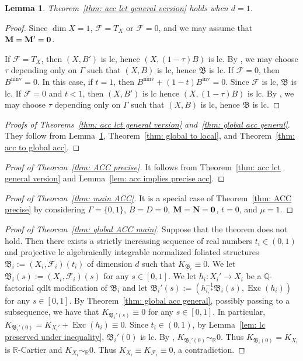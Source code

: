 \documentclass[11pt,reqno]{amsart}
\numberwithin{equation}{section}
\newcommand{\Mm}{{\bf{M}}}
\newcommand{\Nn}{{\bf{N}}}
\newcommand{\Exc}{\operatorname{Exc}}
\newcommand{\ninv}{\operatorname{ninv}}
\newcommand{\inv}{\operatorname{inv}}
\newcommand{\Bb}{{\mathfrak{B}}}
\newcommand{\Ff}{\mathcal{F}}
\newcommand{\Ii}{\Gamma}
\newtheorem{lem}[thm]{Lemma}
\theoremstyle{definition}
\begin{document}
\begin{lem}\label{lem: acc dim 1}
     Theorem~\ref{thm: acc lct general version} holds when $d=1$.
\end{lem}
\begin{proof}
Since $\dim X=1$, $\Ff=T_X$ or $\Ff=0$, and we may assume that $\Mm=\Mm'=\bm{0}$.

If $\Ff=T_X$, then $(X,B')$ is lc, hence $(X,(1-\tau)B)$ is lc. By \cite[Theorem~1.1]{HMX14}, we may choose $\tau$ depending only on $\Ii$ such that $(X,B)$ is lc, hence $\Bb$ is lc. If $\Ff=0$, then $B^{\ninv}=0$. In this case, if $t=1$, then $B^{\ninv}+(1-t)B^{\inv}=0$. Since $\Ff$ is lc, $\Bb$ is lc. If $\Ff=0$ and $t<1$, then $(X,B')$ is lc hence $(X,(1-\tau)B)$ is lc. By \cite[Theorem~1.1]{HMX14}, we may choose $\tau$ depending only on $\Ii$ such that $(X,B)$ is lc, hence $\Bb$ is lc.
\end{proof}

\begin{proof}[Proofs of Theorems~\ref{thm: acc lct general version} and~\ref{thm: global acc general}]
They follow from Lemma~\ref{lem: acc dim 1}, Theorem~\ref{thm: global to local}, and Theorem~\ref{thm: acc to global acc}.
\end{proof}


\begin{proof}[Proof of Theorem~\ref{thm: ACC precise}]
It follows from Theorem~\ref{thm: acc lct general version} and Lemma~\ref{lem: acc implies precise acc}.
\end{proof}


\begin{proof}[Proof of Theorem~\ref{thm: main ACC}]
It is a special case of Theorem~\ref{thm: ACC precise} by considering $\Ii=\{0,1\}$, $B=D=0$, $\Mm=\Nn=\bm{0}$, $t=0$, and $\mu=1$.
\end{proof}


\begin{proof}[Proof of Theorem~\ref{thm: global ACC main}]
Suppose that the theorem does not hold. Then there exists a strictly increasing sequence of real numbers $t_i\in (0,1)$ and projective lc algebraically integrable normalized foliated structures $\Bb_i:=(X_i,\Ff_i)(t_i)$ of dimension $d$ such that $K_{\Bb_i}\equiv 0$. We let $\Bb_i(s):=(X_i,\Ff_i)(s)$ for any $s\in [0,1]$. We let $h_i: X_i'\rightarrow X_i$ be a $\mathbb Q$-factorial qdlt modification of $\Bb_i$ and let $\Bb_i'(s):=(h_{i,*}^{-1}\Bb_i(s),\Exc(h_i))$ for any $s\in [0,1]$. By Theorem~\ref{thm: global acc general}, possibly passing to a subsequence, we have that $K_{\Bb_i'(s)}\equiv 0$ for any $s\in [0,1]$. In particular, $K_{\Bb_i'(0)}=K_{X_i'}+\Exc(h_i)\equiv 0$. Since $t_i\in (0,1)$, by Lemma~\ref{lem: lc preserved under inequality}, $\Bb_i'(0)$ is lc. By \cite[Theorem~1.4]{Gon11}, $K_{\Bb_i'(0)}\sim_{\mathbb R}0$. Thus $K_{\Bb_i(0)}=K_{X_i}$ is $\mathbb R$-Cartier and $K_{X_i}\sim_{\mathbb R}0$. Thus $K_{X_i}\equiv K_{\Ff_i}\equiv 0$, a contradiction.
\end{proof}
\end{document}

